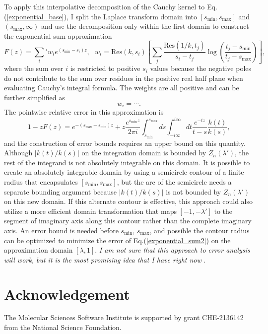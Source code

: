 \documentclass[12pt]{article}
\begin{document}
To apply this interpolative decomposition of the Cauchy kernel to Eq.\@ (\ref{exponential_base}), I split the Laplace transform domain into $[s_{\min},s_{\max}]$ and $(s_{\max}, \infty)$
 and use the decomposition only within the first domain to construct the exponential sum approximation
\begin{equation}
 F(z) = {\sum_i} ' w_i e^{(s_{\min}-s_i) z},  \ \ \ w_i = \mathrm{Res}(k, s_i) \left[ \sum_j \frac{\mathrm{Res}(1/k,t_j)}{s_i - t_j} \log \left( \frac{t_j - s_{\min}}{t_j - s_{\max}} \right) \right],
\end{equation}
 where the sum over $i$ is restricted to positive $s_i$ values because the negative poles do not contribute to the sum over residues in the positive real half plane when evaluating Cauchy's integral formula.
The weights are all positive and can be further simplified as
\begin{equation}
 w_i = \cdots .
\end{equation}
The pointwise relative error in this approximation is
\begin{equation}
 1 - z F(z) = e^{-(s_{\max} - s_{\min}) z} + z \frac{e^{s_{\min}z}}{2 \pi i} \int_{s_{\min}}^{s_{\max}} ds \int_{-i\infty}^{i\infty} dt \frac{e^{-tz}}{t - s} \frac{k(t)}{k(s)},
\end{equation}
 and the construction of error bounds requires an upper bound on this quantity.
Although $|k(t)/k(s)|$ on the integration domain is bounded by $Z_n(\lambda')$, the rest of the integrand is not absolutely integrable on this domain.
It is possible to create an absolutely integrable domain by using a semicircle contour of a finite radius that encapsulates $[s_{\min}, s_{\max}]$,
 but the arc of the semicircle needs a separate bounding argument because $|k(t)/k(s)|$ is not bounded by $Z_n(\lambda')$ on this new domain.
If this alternate contour is effective, this approach could also utilize a more efficient domain transformation that maps $[-1,-\lambda']$
 to the segment of imaginary axis along this contour rather than the complete imaginary axis.
An error bound is needed before $s_{\min}$, $s_{\max}$, and possible the contour radius can be optimized to minimize the error of Eq.\@ (\ref{exponential_sum2}) on the approximation domain $[\lambda,1]$.
\textit{ I am not sure that this approach to error analysis will work, but it is the most promising idea that I have right now }.

\section*{Acknowledgement}
The Molecular Sciences Software Institute is supported by grant CHE-2136142 from the National Science Foundation.

\printbibliography
\end{document}
